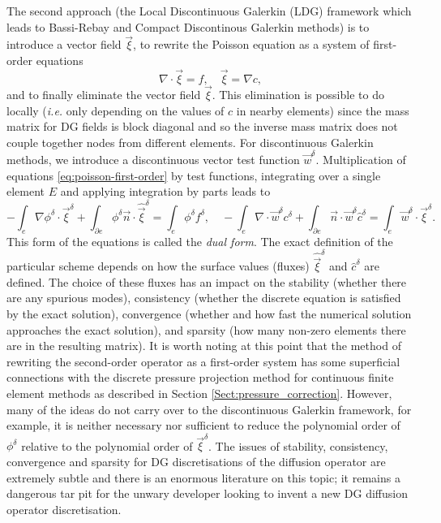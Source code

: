 The second approach (the Local Discontinuous Galerkin (LDG) framework
\citep{cockburn1998,sherwin2006} which leads to Bassi-Rebay and
Compact Discontinous Galerkin methods) is to introduce a vector field
$\vec{\xi}$, to rewrite the Poisson equation as a system of
first-order equations
\begin{equation}
\label{eq:poisson-first-order}
\nabla\cdot\vec{\xi} = f, \quad \vec{\xi}=\nabla c,
\end{equation}
and to finally eliminate the vector field $\vec{\xi}$. This
elimination is possible to do locally (\emph{i.e.} only depending on
the values of $c$ in nearby elements) since the mass matrix for DG
fields is block diagonal and so the inverse mass matrix does not
couple together nodes from different elements. For discontinuous
Galerkin methods, we introduce a discontinuous vector test function
$\vec{w}^{\delta}$. Multiplication of equations
\eqref{eq:poisson-first-order} by test functions, integrating over a
single element $E$ and applying integration by parts leads to
\begin{equation}
\label{eq:ldg}
-\int_e\nabla\phi^{\delta}\cdot\vec{\xi}^\delta + \int_{\partial e}
\phi^\delta\vec{n}\cdot\hat{\vec{\xi}}^{\delta} =
\int_e\phi^\delta f^\delta,
\quad
-\int_e\nabla\cdot\vec{w}^\delta c^\delta + \int_{\partial e}
\vec{n}\cdot\vec{w}^\delta \hat{c}^\delta = \int_e\vec{w}^\delta\cdot\vec{\xi}^\delta.
\end{equation}
This form of the equations is called the \emph{dual form}.  The exact
definition of the particular scheme depends on how the surface values
(fluxes) $\hat{\vec{\xi}}^\delta$ and $\hat{c}^\delta$ are
defined. The choice of these fluxes has an impact on the stability
(whether there are any spurious modes), consistency (whether the
discrete equation is satisfied by the exact solution), convergence
(whether and how fast the numerical solution approaches the exact
solution), and sparsity (how many non-zero elements there are in the
resulting matrix). It is worth noting at this point that the method of
rewriting the second-order operator as a first-order system has some
superficial connections with the discrete pressure projection method
for continuous finite element methods as described in Section
\ref{Sect:pressure_correction}. However, many of the ideas do not
carry over to the discontinuous Galerkin framework, for example, it is
neither necessary nor sufficient to reduce the polynomial order of
$\phi^\delta$ relative to the polynomial order of
$\vec{\xi}^\delta$. The issues of stability, consistency, convergence
and sparsity for DG discretisations of the diffusion operator are
extremely subtle and there is an enormous literature on this topic; it
remains a dangerous tar pit for the unwary developer looking to invent
a new DG diffusion operator discretisation.

